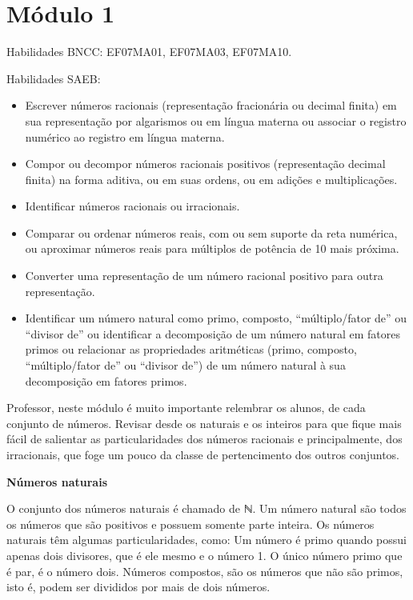 
\newcommand{\text}[1]{}

\section{Módulo 1}

Habilidades BNCC: EF07MA01, EF07MA03, EF07MA10.

Habilidades SAEB:

\begin{itemize}
\item
  Escrever números racionais (representação fracionária ou decimal
  finita) em sua representação por algarismos ou em língua materna ou
  associar o registro numérico ao registro em língua materna.
\item
  Compor ou decompor números racionais positivos (representação decimal
  finita) na forma aditiva, ou em suas ordens, ou em adições e
  multiplicações.
\item
  Identificar números racionais ou irracionais.
\item
  Comparar ou ordenar números reais, com ou sem suporte da reta
  numérica, ou aproximar números reais para múltiplos de potência de 10
  mais próxima.
\item
  Converter uma representação de um número racional positivo para outra
  representação.
\item
  Identificar um número natural como primo, composto, ``múltiplo/fator
  de'' ou ``divisor de'' ou identificar a decomposição de um número
  natural em fatores primos ou relacionar as propriedades aritméticas
  (primo, composto, ``múltiplo/fator de'' ou ``divisor de'') de um
  número natural à sua decomposição em fatores primos.
\end{itemize}


Professor, neste módulo é muito importante relembrar os alunos, de cada
conjunto de números. Revisar desde os naturais e os inteiros para que
fique mais fácil de salientar as particularidades dos números racionais
e principalmente, dos irracionais, que foge um pouco da classe de
pertencimento dos outros conjuntos.~

\textbf{Números naturais}

O conjunto dos números naturais é chamado de ℕ. Um número natural são
todos os números que são positivos e possuem somente parte inteira. Os
números naturais têm algumas particularidades, como: Um número é primo
quando possui apenas dois divisores, que é ele mesmo e o número 1. O
único número primo que é par, é o número dois. Números compostos, são os
números que não são primos, isto é, podem ser divididos por mais de dois
números.~

